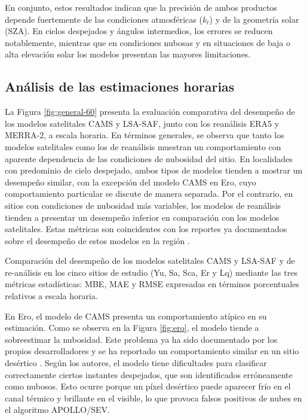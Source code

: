 \documentclass[letterpaper,12pt, twoside]{report}
\providecommand{\DIFdeltex}[1]{{\protect\color{red} \scriptsize #1}} %
\providecommand{\DIFdelFL}[1]{\DIFdel{#1}} %
\providecommand{\DIFdel}[1]{\texorpdfstring{\DIFdeltex{#1}}{}} %
\begin{document}
\DIFdel{En conjunto, estos resultados indican que la precisión de ambos productos depende fuertemente de las condiciones atmosféricas ($k_t$) y de la geometría solar (SZA). En cielos despejados y ángulos intermedios, los errores se reducen notablemente, mientras que en condiciones nubosas y en situaciones de baja o alta elevación solar los modelos presentan las mayores limitaciones.
}%

\subsection{\DIFdel{Análisis de las estimaciones horarias}}
\addtocounter{subsection}{-1}%

\DIFdel{La Figura \ref{fig:general-60} presenta la evaluación comparativa del desempeño de los modelos satelitales CAMS y LSA-SAF, junto con los reanálisis ERA5 y MERRA-2, a escala horaria. En términos generales, se observa que tanto los modelos satelitales como los de reanálisis muestran un comportamiento con aparente dependencia de las condiciones de nubosidad del sitio. En localidades con predominio de cielo despejado, ambos tipos de modelos tienden a mostrar un desempeño similar, con la excepción del modelo CAMS en Ero, cuyo comportamiento particular se discute de manera separada. Por el contrario, en sitios con condiciones de nubosidad más variables, los modelos de reanálisis tienden a presentar un desempeño inferior en comparación con los modelos satelitales. Estas métricas son coincidentes con los reportes ya documentados sobre el desempeño de estos modelos en la región \citep{Ledesma2025}.}%

{%
\DIFdelFL{Comparación del desempeño de los modelos satelitales CAMS y LSA-SAF y de re-análisis en los cinco sitios de estudio (Yu, Sa, Sca, Er y Lq) mediante las tres métricas estadísticas: MBE, MAE y RMSE expresadas en términos porcentuales relativos a escala horaria.}}

\DIFdel{En Ero, el modelo de CAMS presenta un comportamiento atípico en su estimación. Como se observa en la Figura \ref{fig:ero}, el modelo tiende a sobreestimar la nubosidad. Este problema ya ha sido documentado por los propios desarrolladores y se ha reportado un comportamiento similar en un sitio desértico \cite{qu2017}. Según los autores, el modelo tiene dificultades para clasificar correctamente ciertos instantes despejados, que son identificados erróneamente como nubosos. Esto ocurre porque un píxel desértico puede aparecer frío en el canal térmico y brillante en el visible, lo que provoca falsos positivos de nubes en el algoritmo APOLLO/SEV.
}%
\end{document}
